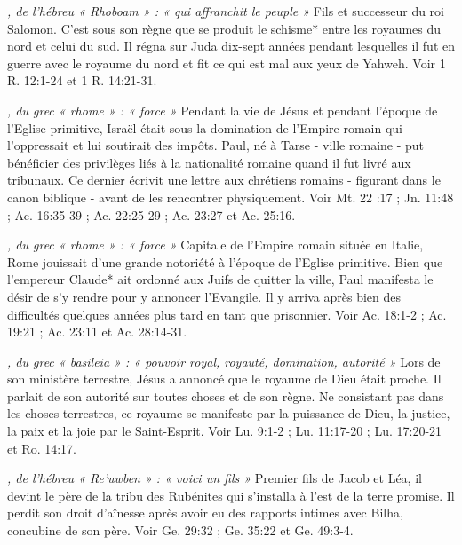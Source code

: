 \begin{multicols}{2}
{\textit{, de l'hébreu « Rhoboam » : « qui affranchit le peuple »}\newline
Fils et successeur du roi Salomon. C'est sous son règne que se produit le schisme* entre les royaumes du nord et celui du sud. Il régna sur Juda dix-sept années pendant lesquelles il fut en guerre avec le royaume du nord et fit ce qui est mal aux yeux de Yahweh. Voir 1 R. 12:1-24 et 1 R. 14:21-31.

\textit{, du grec « rhome » : « force »}\newline
Pendant la vie de Jésus et pendant l'époque de l'Eglise primitive, Israël était sous la domination de l'Empire romain qui l'oppressait et lui soutirait des impôts. Paul, né à Tarse - ville romaine - put bénéficier des privilèges liés à la nationalité romaine quand il fut livré aux tribunaux. Ce dernier écrivit une lettre aux chrétiens romains - figurant dans le canon biblique - avant de les rencontrer physiquement. Voir Mt. 22 :17 ; Jn. 11:48 ; Ac. 16:35-39 ; Ac. 22:25-29 ; Ac. 23:27 et Ac. 25:16.

\textit{, du grec « rhome » : « force »}\newline
Capitale de l'Empire romain située en Italie, Rome jouissait d'une grande notoriété à l'époque de l'Eglise primitive. Bien que l'empereur Claude* ait ordonné aux Juifs de quitter la ville, Paul manifesta le désir de s'y rendre pour y annoncer l'Evangile. Il y arriva après bien des difficultés quelques années plus tard en tant que prisonnier. Voir Ac. 18:1-2 ; Ac. 19:21 ; Ac. 23:11 et Ac. 28:14-31.

\textit{, du grec « basileia » : « pouvoir royal, royauté, domination, autorité »}\newline
Lors de son ministère terrestre, Jésus a annoncé que le royaume de Dieu était proche. Il parlait de son autorité sur toutes choses et de son règne. Ne consistant pas dans les choses terrestres, ce royaume se manifeste par la puissance de Dieu, la justice, la paix et la joie par le Saint-Esprit. Voir Lu. 9:1-2 ; Lu. 11:17-20 ; Lu. 17:20-21 et Ro. 14:17.

\textit{, de l'hébreu « Re'uwben » : « voici un fils »}\newline
Premier fils de Jacob et Léa, il devint le père de la tribu des Rubénites qui s'installa à l'est de la terre promise. Il perdit son droit d'aînesse après avoir eu des rapports intimes avec Bilha, concubine de son père. Voir Ge. 29:32 ; Ge. 35:22 et Ge. 49:3-4.

}
\end{multicols}
